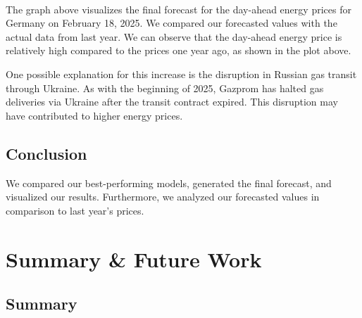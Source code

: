 \documentclass[a4paper]{article}
\begin{document}
    \begin{center}
    \end{center}
    { \hspace*{\fill} \\}
    
    The graph above visualizes the final forecast for the day-ahead energy
prices for Germany on February 18, 2025. We compared our forecasted
values with the actual data from last year. We can observe that the
day-ahead energy price is relatively high compared to the prices one
year ago, as shown in the plot above.

One possible explanation for this increase is the disruption in Russian
gas transit through Ukraine. As with the beginning of 2025, Gazprom has
halted gas deliveries via Ukraine after the transit contract expired.
This disruption may have contributed to higher energy prices.

    \subsection{Conclusion}\label{conclusion}

We compared our best-performing models, generated the final forecast,
and visualized our results. Furthermore, we analyzed our forecasted
values in comparison to last year's prices.

    \section{Summary \& Future Work}\label{summary-future-work}

    \subsection{Summary}\label{summary}
\end{document}
